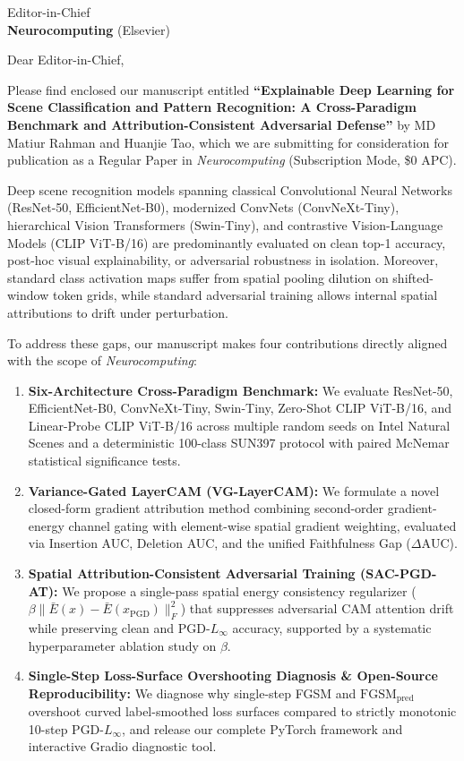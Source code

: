 \documentclass[11pt,a4paper]{letter}
\begin{document}
\begin{letter}{Editor-in-Chief\\
\textbf{Neurocomputing} (Elsevier)}

\opening{Dear Editor-in-Chief,}

Please find enclosed our manuscript entitled \textbf{``Explainable Deep Learning for Scene Classification and Pattern Recognition: A Cross-Paradigm Benchmark and Attribution-Consistent Adversarial Defense''} by MD Matiur Rahman and Huanjie Tao, which we are submitting for consideration for publication as a Regular Paper in \emph{Neurocomputing} (Subscription Mode, \$0 APC).

Deep scene recognition models spanning classical Convolutional Neural Networks (ResNet-50, EfficientNet-B0), modernized ConvNets (ConvNeXt-Tiny), hierarchical Vision Transformers (Swin-Tiny), and contrastive Vision-Language Models (CLIP ViT-B/16) are predominantly evaluated on clean top-1 accuracy, post-hoc visual explainability, or adversarial robustness in isolation. Moreover, standard class activation maps suffer from spatial pooling dilution on shifted-window token grids, while standard adversarial training allows internal spatial attributions to drift under perturbation.

To address these gaps, our manuscript makes four contributions directly aligned with the scope of \emph{Neurocomputing}:
\begin{enumerate}
    \item \textbf{Six-Architecture Cross-Paradigm Benchmark:} We evaluate ResNet-50, EfficientNet-B0, ConvNeXt-Tiny, Swin-Tiny, Zero-Shot CLIP ViT-B/16, and Linear-Probe CLIP ViT-B/16 across multiple random seeds on Intel Natural Scenes and a deterministic 100-class SUN397 protocol with paired McNemar statistical significance tests.
    \item \textbf{Variance-Gated LayerCAM (VG-LayerCAM):} We formulate a novel closed-form gradient attribution method combining second-order gradient-energy channel gating with element-wise spatial gradient weighting, evaluated via Insertion AUC, Deletion AUC, and the unified Faithfulness Gap ($\Delta\text{AUC}$).
    \item \textbf{Spatial Attribution-Consistent Adversarial Training (SAC-PGD-AT):} We propose a single-pass spatial energy consistency regularizer ($\beta \|\bar{E}(x) - \bar{E}(x_{\text{PGD}})\|_F^2$) that suppresses adversarial CAM attention drift while preserving clean and $\text{PGD-}L_\infty$ accuracy, supported by a systematic hyperparameter ablation study on $\beta$.
    \item \textbf{Single-Step Loss-Surface Overshooting Diagnosis & Open-Source Reproducibility:} We diagnose why single-step FGSM and $\text{FGSM}_{\text{pred}}$ overshoot curved label-smoothed loss surfaces compared to strictly monotonic 10-step $\text{PGD-}L_\infty$, and release our complete PyTorch framework and interactive Gradio diagnostic tool.
\end{enumerate}


\end{letter}
\end{document}
